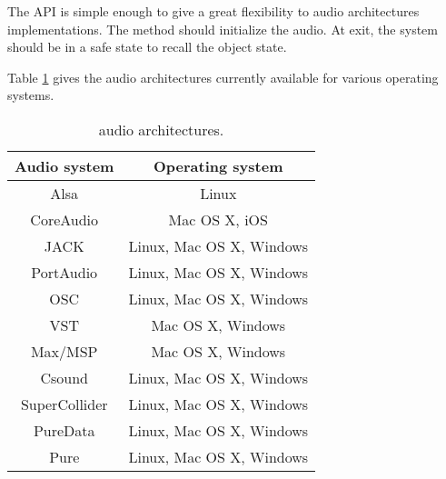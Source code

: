 The API is simple enough to give a great flexibility to audio architectures implementations. The  method should initialize the audio. At  exit, the system should be in a safe state to recall the  object state.

Table \ref{tab:aarch} gives the audio architectures currently available for various operating systems.
\begin{table}[htp]
\begin{center}
\begin{tabular}{|c|c|}
\hline
\bf{Audio system} & \bf{Operating system} \\
\hline
Alsa  & Linux \\
CoreAudio 		& Mac OS X, iOS \\
JACK 			& Linux, Mac OS X, Windows \\
PortAudio 			& Linux, Mac OS X, Windows \\
OSC				& Linux, Mac OS X, Windows \\
VST				& Mac OS X, Windows \\
Max/MSP			& Mac OS X, Windows \\
Csound			& Linux, Mac OS X, Windows \\
SuperCollider		& Linux, Mac OS X, Windows \\
PureData			& Linux, Mac OS X, Windows \\
Pure 			& Linux, Mac OS X, Windows \\
\hline
\end{tabular}
\end{center}
\caption{\faust audio architectures.}
\label{tab:aarch}
\end{table}%
 

